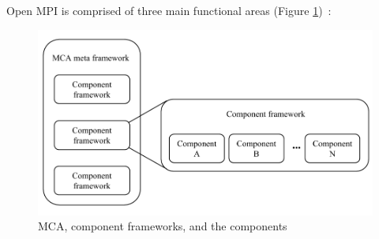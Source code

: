 Open MPI is comprised of three main functional areas (Figure \ref{fig:MCA_framework})~\cite{graham2006open}:

\begin{figure}[h!]
\centering
\includegraphics[scale=0.4]{images/MCA_framework.png}
\caption{MCA, component frameworks, and the components}
\label{fig:MCA_framework}
\end{figure}

